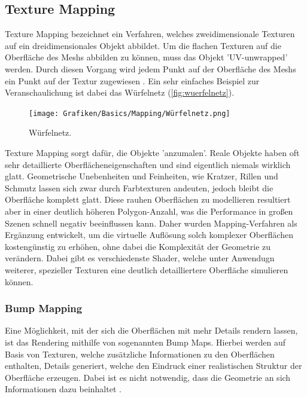 \subsection{Texture Mapping}

Texture Mapping bezeichnet ein Verfahren, welches zweidimensionale Texturen auf ein dreidimensionales Objekt
abbildet. Um die flachen Texturen auf die Oberfläche des Meshs abbilden zu können, muss das Objekt 'UV-unwrapped' werden.
Durch diesen Vorgang wird jedem Punkt auf der Oberfläche des Meshs ein Punkt auf der Textur zugewiesen \parencite{Catmull1974} \parencite{Blinn1976}.
Ein sehr einfaches Beispiel zur Veranschaulichung ist dabei das Würfelnetz (\autoref{fig:wuerfelnetz}).
\begin{figure}[h]
	\centering
	\texttt{[image: Grafiken/Basics/Mapping/Würfelnetz.png]}
	\begin{footnotesize}
		\caption{Würfelnetz.}
		\label{fig:wuerfelnetz}
	\end{footnotesize}
\end{figure}

Texture Mapping sorgt dafür, die Objekte 'anzumalen'.
Reale Objekte haben oft sehr detaillierte Oberflächeneigenschaften und sind eigentlich niemals wirklich glatt.
Geometrische Unebenheiten und Feinheiten, wie Kratzer, Rillen und Schmutz lassen sich zwar durch 
Farbtexturen andeuten, jedoch bleibt die Oberfläche komplett glatt. Diese rauhen Oberflächen zu modellieren resultiert
aber in einer deutlich höheren Polygon-Anzahl, was die Performance in großen Szenen schnell negativ beeinflussen kann.
Daher wurden Mapping-Verfahren als Ergänzung entwickelt, um die virtuelle Auflösung
solch komplexer Oberflächen kostengünstig zu erhöhen, ohne dabei die Komplexität der Geometrie zu verändern.
Dabei gibt es verschiedenste Shader, welche unter Anwendugn weiterer, spezieller Texturen eine deutlich detailliertere
Oberfläche simulieren können.


\subsubsection{Bump Mapping}

Eine Möglichkeit, mit der sich die Oberflächen mit mehr Details rendern lassen, ist das Rendering
mithilfe von sogenannten Bump Maps.
Hierbei werden auf Basis von Texturen, welche zusätzliche Informationen zu den Oberflächen enthalten,
Details generiert, welche den Eindruck einer realistischen Struktur der Oberfläche erzeugen.
Dabei ist es nicht notwendig, dass die Geometrie an sich Informationen dazu beinhaltet \parencite{Blinn1978}.

